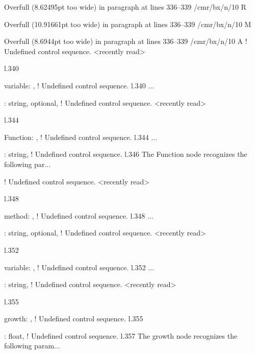 {{{{{{{{{{{{{{{{{Overfull \hbox (8.62495pt too wide) in paragraph at lines 336--339
/cmr/bx/n/10 R

Overfull \hbox (10.91661pt too wide) in paragraph at lines 336--339
/cmr/bx/n/10 M

Overfull \hbox (8.6944pt too wide) in paragraph at lines 336--339
/cmr/bx/n/10 A
! Undefined control sequence.
<recently read> \xmlAttr 
                         
l.340                   \item \xmlAttr
                                      {variable}: ,
! Undefined control sequence.
l.340 ...       \item {}: \xmlDesc
                                                  {string, optional},
! Undefined control sequence.
<recently read> \xmlNode 
                         
l.344             \item \xmlNode
                                {Function}: ,
! Undefined control sequence.
l.344 ...       \item {}: \xmlDesc
                                                  {string},
! Undefined control sequence.
l.346               The \xmlNode
                                {Function} node recognizes the following par...

! Undefined control sequence.
<recently read> \xmlAttr 
                         
l.348                   \item \xmlAttr
                                      {method}: ,
! Undefined control sequence.
l.348 ...         \item {}: \xmlDesc
                                                  {string, optional},
! Undefined control sequence.
<recently read> \xmlNode 
                         
l.352             \item \xmlNode
                                {variable}: ,
! Undefined control sequence.
l.352 ...       \item {}: \xmlDesc
                                                  {string},
! Undefined control sequence.
<recently read> \xmlNode 
                         
l.355             \item \xmlNode
                                {growth}: ,
! Undefined control sequence.
l.355             \item {}: \xmlDesc
                                                  {float},
! Undefined control sequence.
l.357               The \xmlNode
                                {growth} node recognizes the following param...

}}}}}}}}}}}}}}}}}
